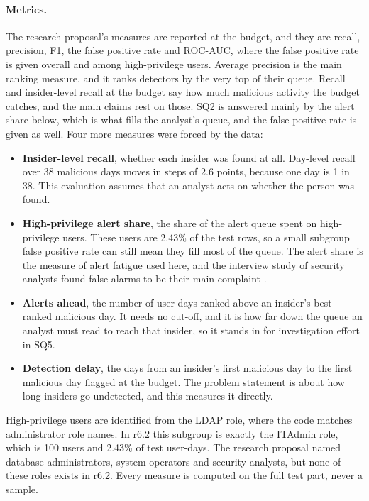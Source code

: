 \documentclass[a4paper,12pt]{article}
\begin{document}
\paragraph{Metrics.} The research proposal's measures are reported at the budget, and they are recall, precision, F1, the false positive rate and ROC-AUC, where the false positive rate is given overall and among high-privilege users. Average precision is the main ranking measure, and it ranks detectors by the very top of their queue. Recall and insider-level recall at the budget say how much malicious activity the budget catches, and the main claims rest on those. SQ2 is answered mainly by the alert share below, which is what fills the analyst's queue, and the false positive rate is given as well. Four more measures were forced by the data:
\begin{itemize}
   \item \textbf{Insider-level recall}, whether each insider was found at all. Day-level recall over 38 malicious days moves in steps of 2.6 points, because one day is 1 in 38. This evaluation assumes that an analyst acts on whether the person was found.
   \item \textbf{High-privilege alert share}, the share of the alert queue spent on high-privilege users. These users are 2.43\% of the test rows, so a small subgroup false positive rate can still mean they fill most of the queue. The alert share is the measure of alert fatigue used here, and the interview study of security analysts found false alarms to be their main complaint \cite{Alahmadi2022}.
   \item \textbf{Alerts ahead}, the number of user-days ranked above an insider's best-ranked malicious day. It needs no cut-off, and it is how far down the queue an analyst must read to reach that insider, so it stands in for investigation effort in SQ5.
   \item \textbf{Detection delay}, the days from an insider's first malicious day to the first malicious day flagged at the budget. The problem statement is about how long insiders go undetected, and this measures it directly.
\end{itemize}
High-privilege users are identified from the LDAP role, where the code matches administrator role names. In r6.2 this subgroup is exactly the ITAdmin role, which is 100 users and 2.43\% of test user-days. The research proposal named database administrators, system operators and security analysts, but none of these roles exists in r6.2. Every measure is computed on the full test part, never a sample.
\end{document}
